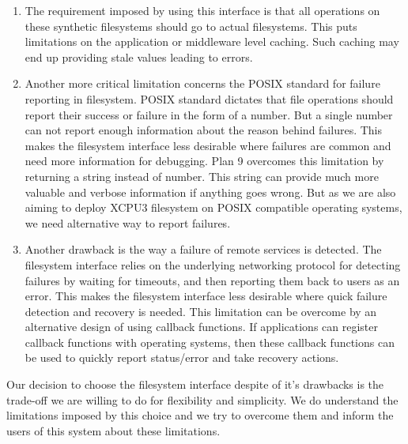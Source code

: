 \begin{enumerate}

\item The requirement imposed by using this interface is that
all operations on these synthetic filesystems should go to actual
filesystems.   This puts limitations on the application or middleware level caching.
Such caching may end up providing stale values leading to errors.

\item Another more critical limitation concerns the POSIX standard for failure reporting 
in filesystem.  POSIX standard dictates that file operations should report their success
or failure in the form of a number.  But a single number can not report enough
information about the reason behind failures.  This makes the filesystem interface
less desirable where failures are common and need more information for
debugging.  Plan 9 overcomes this limitation by returning a string instead
of number.  This string can provide much more valuable and verbose information
if anything goes wrong.  But as we are also aiming to deploy XCPU3 filesystem 
on POSIX compatible operating systems, we need alternative way to report failures.

\item Another drawback is the way a failure of remote services is detected.
The filesystem interface relies on the underlying networking protocol for detecting
failures by waiting for timeouts, and then reporting them back to users as
an error.  This makes the filesystem interface less desirable where quick 
failure detection and recovery is needed.  This limitation can be overcome by 
an alternative design of using callback functions.  If applications can register 
callback functions with operating systems, then these callback functions
can be used to quickly report status/error and take recovery actions.


\end{enumerate}

Our decision to choose the filesystem interface despite of it's drawbacks is the
trade-off we are willing to do for flexibility and simplicity.  We do understand
the limitations imposed by this choice and we try to overcome them and inform 
the users of this system about these limitations.


